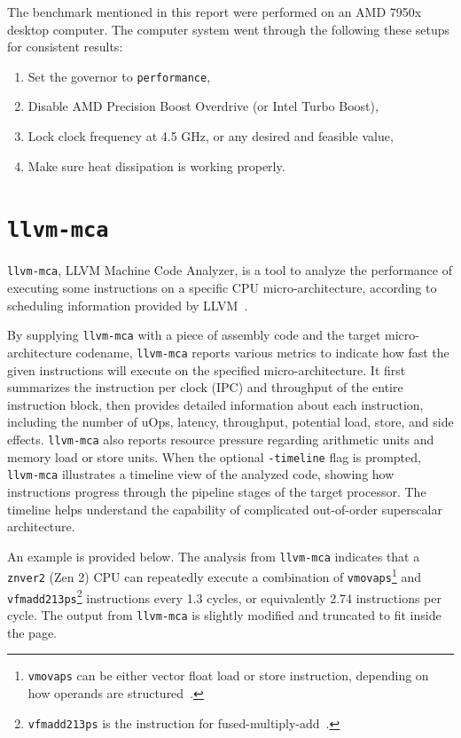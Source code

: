 \documentclass[logo,bsc,singlespacing,parskip]{infthesis}
\newcommand{\mca}{\texttt{llvm-mca}}
\newenvironment{compactlist}
{ \begin{enumerate}
    \setlength{\itemsep}{0pt}
    \setlength{\parskip}{0pt}
    \setlength{\parsep}{0pt}     
}
{ \end{enumerate} }
\begin{document}
The benchmark mentioned in this report were performed on an AMD 7950x desktop computer. The computer system went through the following these setups for consistent results:
\begin{compactlist}
    \item Set the governor to \texttt{performance}, 
    \item Disable AMD Precision Boost Overdrive (or Intel Turbo Boost), 
    \item Lock clock frequency at 4.5 GHz, or any desired and feasible value,
    \item Make sure heat dissipation is working properly.
\end{compactlist}



\section{\mca{}}

\mca{}, LLVM Machine Code Analyzer, is a tool to analyze the performance of
executing some instructions on a specific CPU micro-architecture, according to
scheduling information provided by LLVM~\cite{llvm-mca}. 

By supplying \mca{} with a piece of assembly code and the target micro-architecture codename, \mca{} reports various metrics to indicate how fast the given instructions will execute on the specified micro-architecture. It first summarizes the instruction per clock (IPC) and throughput of the entire instruction block, then provides detailed information about each instruction, including the number of uOps, latency, throughput, potential load, store, and side effects. \mca{} also reports resource pressure regarding arithmetic units and memory load or store units. When the optional \texttt{-timeline} flag is prompted, \mca{} illustrates a timeline view of the analyzed code, showing how instructions progress through the pipeline stages of the target processor. The timeline helps understand the capability of complicated out-of-order superscalar architecture. 

An example is provided below. The analysis from \mca{} indicates that a \texttt{znver2} (Zen 2) CPU can repeatedly execute a combination of \texttt{vmovaps}\footnote{\texttt{vmovaps} can be either vector float load or store instruction, depending on how operands are structured~\cite{instruction}.} and \texttt{vfmadd213ps}\footnote{\texttt{vfmadd213ps} is the instruction for fused-multiply-add~\cite{instruction}.} instructions every 1.3 cycles, or equivalently 2.74 instructions per cycle. The output from \mca{} is slightly modified and truncated to fit inside the page.
\end{document}
